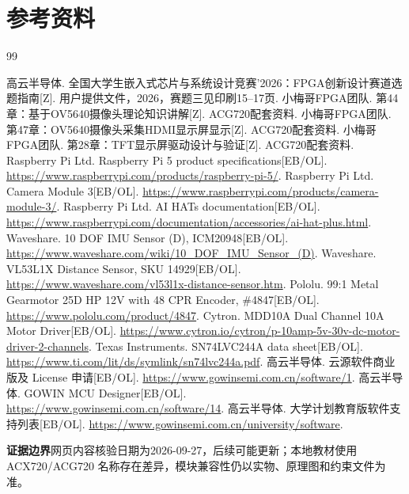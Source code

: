 \documentclass[UTF8,a4paper,zihao=-4,fontset=fandol]{ctexart}
\newcommand{\note}[2]{\par\smallskip\noindent\colorbox{Pale}{\parbox{\dimexpr\linewidth-2\fboxsep\relax}{\small\textbf{\color{Teal}#1}\quad #2}}\par\smallskip}
\begin{document}
\section*{参考资料}
\begin{thebibliography}{99}\small\raggedright
{} 高云半导体. 全国大学生嵌入式芯片与系统设计竞赛'2026：FPGA创新设计赛道选题指南[Z]. 用户提供文件，2026，赛题三见印刷15--17页.
 小梅哥FPGA团队. 第44章：基于OV5640摄像头理论知识讲解[Z]. ACG720配套资料.
 小梅哥FPGA团队. 第47章：OV5640摄像头采集HDMI显示屏显示[Z]. ACG720配套资料.
 小梅哥FPGA团队. 第28章：TFT显示屏驱动设计与验证[Z]. ACG720配套资料.
 Raspberry Pi Ltd. Raspberry Pi 5 product specifications[EB/OL]. \url{https://www.raspberrypi.com/products/raspberry-pi-5/}.
 Raspberry Pi Ltd. Camera Module 3[EB/OL]. \url{https://www.raspberrypi.com/products/camera-module-3/}.
 Raspberry Pi Ltd. AI HATs documentation[EB/OL]. \url{https://www.raspberrypi.com/documentation/accessories/ai-hat-plus.html}.
 Waveshare. 10 DOF IMU Sensor (D), ICM20948[EB/OL]. \url{https://www.waveshare.com/wiki/10_DOF_IMU_Sensor_(D)}.
 Waveshare. VL53L1X Distance Sensor, SKU 14929[EB/OL]. \url{https://www.waveshare.com/vl53l1x-distance-sensor.htm}.
 Pololu. 99:1 Metal Gearmotor 25D HP 12V with 48 CPR Encoder, \#4847[EB/OL]. \url{https://www.pololu.com/product/4847}.
 Cytron. MDD10A Dual Channel 10A Motor Driver[EB/OL]. \url{https://www.cytron.io/cytron/p-10amp-5v-30v-dc-motor-driver-2-channels}.
 Texas Instruments. SN74LVC244A data sheet[EB/OL]. \url{https://www.ti.com/lit/ds/symlink/sn74lvc244a.pdf}.
 高云半导体. 云源软件商业版及 License 申请[EB/OL]. \url{https://www.gowinsemi.com.cn/software/1}.
 高云半导体. GOWIN MCU Designer[EB/OL]. \url{https://www.gowinsemi.com.cn/software/14}.
 高云半导体. 大学计划教育版软件支持列表[EB/OL]. \url{https://www.gowinsemi.com.cn/university/software}.
\end{thebibliography}

\note{证据边界}{网页内容核验日期为2026-09-27，后续可能更新；本地教材使用 ACX720/ACG720 名称存在差异，模块兼容性仍以实物、原理图和约束文件为准。}
\end{document}
